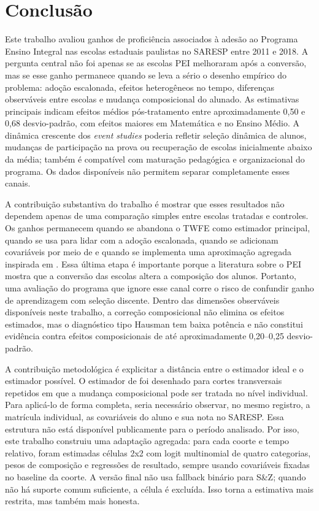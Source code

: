 \chapter{Conclusão} \label{sec:conclusion}

Este trabalho avaliou ganhos de proficiência associados à adesão ao Programa Ensino Integral nas escolas estaduais paulistas no SARESP entre 2011 e 2018. A pergunta central não foi apenas se as escolas PEI melhoraram após a conversão, mas se esse ganho permanece quando se leva a sério o desenho empírico do problema: adoção escalonada, efeitos heterogêneos no tempo, diferenças observáveis entre escolas e mudança composicional do alunado. As estimativas principais indicam efeitos médios pós-tratamento entre aproximadamente 0,50 e 0,68 desvio-padrão, com efeitos maiores em Matemática e no Ensino Médio. A dinâmica crescente dos \textit{event studies} poderia refletir seleção dinâmica de alunos, mudanças de participação na prova ou recuperação de escolas inicialmente abaixo da média; também é compatível com maturação pedagógica e organizacional do programa. Os dados disponíveis não permitem separar completamente esses canais.

A contribuição substantiva do trabalho é mostrar que esses resultados não dependem apenas de uma comparação simples entre escolas tratadas e controles. Os ganhos permanecem quando se abandona o TWFE como estimador principal, quando se usa \textcite{callawaysantanna} para lidar com a adoção escalonada, quando se adicionam covariáveis por meio de \textcite{santannazhao} e quando se implementa uma aproximação agregada inspirada em \textcite{santannaxu}. Essa última etapa é importante porque a literatura sobre o PEI mostra que a conversão das escolas altera a composição dos alunos. Portanto, uma avaliação do programa que ignore esse canal corre o risco de confundir ganho de aprendizagem com seleção discente. Dentro das dimensões observáveis disponíveis neste trabalho, a correção composicional não elimina os efeitos estimados, mas o diagnóstico tipo Hausman tem baixa potência e não constitui evidência contra efeitos composicionais de até aproximadamente 0,20--0,25 desvio-padrão.

A contribuição metodológica é explicitar a distância entre o estimador ideal e o estimador possível. O estimador de \textcite{santannaxu} foi desenhado para cortes transversais repetidos em que a mudança composicional pode ser tratada no nível individual. Para aplicá-lo de forma completa, seria necessário observar, no mesmo registro, a matrícula individual, as covariáveis do aluno e sua nota no SARESP. Essa estrutura não está disponível publicamente para o período analisado. Por isso, este trabalho construiu uma adaptação agregada: para cada coorte e tempo relativo, foram estimadas células 2x2 com logit multinomial de quatro categorias, pesos de composição e regressões de resultado, sempre usando covariáveis fixadas no baseline da coorte. A versão final não usa fallback binário para S\&Z; quando não há suporte comum suficiente, a célula é excluída. Isso torna a estimativa mais restrita, mas também mais honesta.

